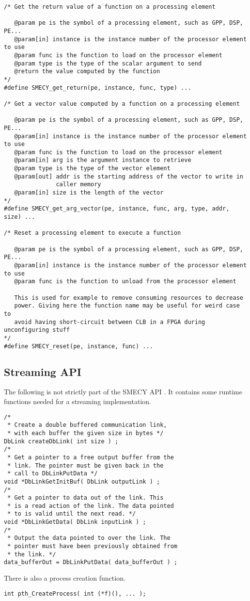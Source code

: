\documentclass[a4paper]{article}
\begin{document}
\begin{lstlisting}[frame=none,numbers=none]
/* Get the return value of a function on a processing element

   @param pe is the symbol of a processing element, such as GPP, DSP, PE...
   @param[in] instance is the instance number of the processor element to use
   @param func is the function to load on the processor element
   @param type is the type of the scalar argument to send
   @return the value computed by the function
*/
#define SMECY_get_return(pe, instance, func, type) ...

/* Get a vector value computed by a function on a processing element

   @param pe is the symbol of a processing element, such as GPP, DSP, PE...
   @param[in] instance is the instance number of the processor element to use
   @param func is the function to load on the processor element
   @param[in] arg is the argument instance to retrieve
   @param type is the type of the vector element
   @param[out] addr is the starting address of the vector to write in
               caller memory
   @param[in] size is the length of the vector
*/
#define SMECY_get_arg_vector(pe, instance, func, arg, type, addr, size) ...

/* Reset a processing element to execute a function

   @param pe is the symbol of a processing element, such as GPP, DSP, PE...
   @param[in] instance is the instance number of the processor element to use
   @param func is the function to unload from the processor element

   This is used for example to remove consuming resources to decrease
   power. Giving here the function name may be useful for weird case to
   avoid having short-circuit between CLB in a FPGA during unconfiguring stuff
*/
#define SMECY_reset(pe, instance, func) ...
	\end{lstlisting}
	
	\subsection{Streaming API}
	The following is not strictly part of the SMECY API \cite{smec}. It
    contains some runtime functions needed for a streaming implementation.
	\begin{lstlisting}[frame=none, numbers=none]
/*
 * Create a double buffered communication link,
 * with each buffer the given size in bytes */
DbLink createDbLink( int size ) ;
/*
 * Get a pointer to a free output buffer from the
 * link. The pointer must be given back in the
 * call to DbLinkPutData */
void *DbLinkGetInitBuf( DbLink outputLink ) ;
/*
 * Get a pointer to data out of the link. This
 * is a read action of the link. The data pointed
 * to is valid until the next read. */
void *DbLinkGetData( DbLink inputLink ) ;
/*
 * Output the data pointed to over the link. The
 * pointer must have been previously obtained from
 * the link. */
data_bufferOut = DbLinkPutData( data_bufferOut ) ;
	\end{lstlisting} 

	There is also a process creation function.
	\begin{lstlisting}[frame=none, numbers=none]
int pth_CreateProcess( int (*f)(), ... );
	\end{lstlisting}
	
	{}
	 

	
\end{document}
